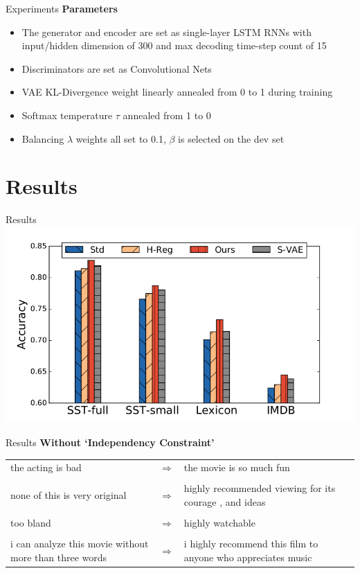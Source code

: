 \documentclass{beamer}
\begin{document}
\begin{frame}{Experiments}
	\textbf{Parameters}
	\begin{itemize}
		\item The generator and encoder are set as single-layer LSTM RNNs with input/hidden dimension of 300 and max decoding time-step count of 15
		\item Discriminators are set as Convolutional Nets
		\item VAE KL-Divergence weight linearly annealed from 0 to 1 during training
		\item Softmax temperature $\tau$ annealed from 1 to 0
		\item Balancing $\lambda$ weights all set to 0.1, $\beta$ is selected on the dev set
	\end{itemize}
\end{frame}

\section{Results}
\begin{frame}{Results}
	\centering
	\includegraphics[width=\textwidth]{images/senti.png}
\end{frame}

\begin{frame}{Results}
	\centering
	\textbf{Without `Independency Constraint'} \\
	\vspace{1cm}
	\small
	\begin{tabular}{ p{.4\linewidth} p{.05\linewidth} p{.4\linewidth} }
		the acting is bad                                      & $\Rightarrow$ & the movie is so much fun                                     \\ \\
		none of this is very original                          & $\Rightarrow$ & highly recommended viewing for its courage , and ideas       \\ \\
		too bland                                              & $\Rightarrow$ & highly watchable                                             \\ \\
		i can analyze this movie without more than three words & $\Rightarrow$ & i highly recommend this film to anyone who appreciates music
	\end{tabular}
\end{frame}
\end{document}
